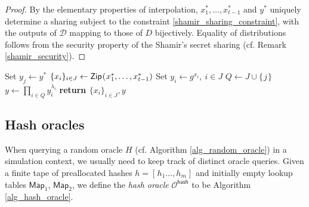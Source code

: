 \documentclass{iacrtrans}
\begin{document}
\begin{proof}
By the elementary properties of interpolation,
$x_1^*, \dots, x_{t-1}^*$ and $y^*$
uniquely determine a sharing
subject to the constraint \eqref{shamir_sharing_constraint},
with the outputs of $\mathcal{D}$
mapping to those of $D$ bijectively.
Equality of distributions follows
from the security property of the Shamir's secret sharing
(cf. Remark \ref{shamir_security}).
\end{proof}

\begin{minipage}{0.96\textwidth}
\begin{algorithm}[H]
    \centering
    \caption{$\mathcal{D}\hspace{1pt}(
	\hspace{1pt}y^*,
	x_1^*, \dots, x_{t-1}^*
	\hspace{1pt};
	j\hspace{1pt},
	J
)$}\label{alg_shamir_simulation}
    \begin{algorithmic}[1]
    	\vspace{4pt}
    	\State
    		Set $y_j \leftarrow y^*$\vspace{6pt}
    	\State
    		$\{x_i\}_{i \in J} \leftarrow
    		\mathsf{Zip}\hspace{0.75pt}
    		(\hspace{0.5pt}x_1^*, \dots, x_{t-1}^*)$\vspace{6pt}
		\State
    		Set $y_i \leftarrow g ^ {x_i},\ i \in J$\vspace{6pt}
    	\State
    		$Q \leftarrow J \cup \{\hspace{1pt}j\hspace{1pt}\}$\vspace{6pt}
    	\State
    		$y \leftarrow \prod_{i \in Q} y_i ^ {\lambda_i}$\vspace{6pt}
		\State
			\textbf{return $\{x_i\}_{i \in J}, y$}\vspace{5pt}
    \end{algorithmic}
\end{algorithm}
\vspace{0pt}
\end{minipage}

\subsection{Hash oracles}\label{section_hash_oracles}

When querying a random oracle $H$
(cf. Algorithm \ref{alg_random_oracle})
in a simulation context,
we usually need to keep track of distinct oracle queries.
Given a finite tape of preallocated hashes
$h = [\hspace{1pt}h_1 \dots, h_m \hspace{1pt}]$
and initially empty lookup tables
$\mathsf{Map}_1$, $\mathsf{Map}_2$,
we define the \textit{hash oracle} $\mathcal{O}^{\mathsf{hash}}$
to be Algorithm \ref{alg_hash_oracle}.
\end{document}

